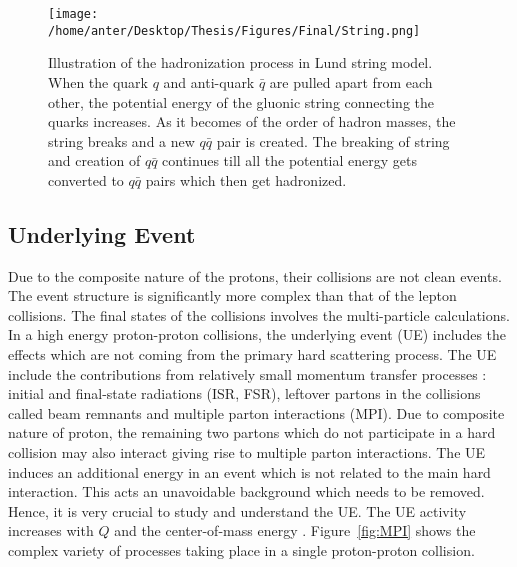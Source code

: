 \begin{figure}[!h]
\begin{center}
\hspace*{-4mm}
\texttt{[image: /home/anter/Desktop/Thesis/Figures/Final/String.png]}\\
\vspace*{4mm}
\caption[Illustration of the hadronization process in Lund string model.]{Illustration of the hadronization process in Lund string model\footnotemark. When the quark $q$ and anti-quark $\bar{q}$ are pulled apart from each other, the potential energy of the gluonic string connecting the quarks increases. As it becomes of the order of hadron masses, the string breaks and a new $q\bar{q}$ pair is created. The breaking of string and creation of $q\bar{q}$ continues till all the potential energy gets converted to $q\bar{q}$ pairs which then get hadronized.}
\label{fig:string}
\end{center}
\end{figure}
\subsection{Underlying Event}
Due to the composite nature of the protons, their collisions are not clean events. The event structure is significantly more complex than that of the lepton collisions. The final states of the collisions involves the multi-particle calculations. In a high energy proton-proton collisions, the underlying event (UE) includes the effects which are not coming from the primary hard scattering process. The UE include the contributions from relatively small momentum transfer processes : initial and final-state radiations (ISR, FSR), leftover partons in the collisions called beam remnants and multiple parton interactions (MPI). Due to composite nature of proton, the remaining two partons which do not participate in a hard collision may also interact giving rise to multiple parton interactions. The UE induces an additional energy in an event which is not related to the main hard interaction. This acts an unavoidable background which needs to be removed. Hence, it is very crucial to study and understand the UE. The UE activity increases with $Q$ and the center-of-mass energy \cme. Figure~\ref{fig:MPI} shows the complex variety of processes taking place in a single proton-proton collision.

